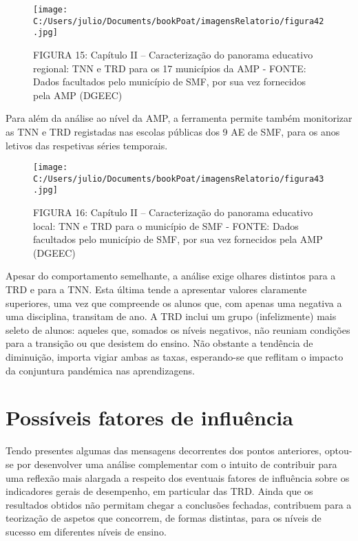 \documentclass[
]{book}
\begin{document}
\begin{figure}
\centering
\texttt{[image: C:/Users/julio/Documents/bookPoat/imagensRelatorio/figura42.jpg]}
\caption{FIGURA 15: Capítulo II -- Caracterização do panorama educativo regional: TNN e TRD para os 17 municípios da AMP - FONTE: Dados facultados pelo município de SMF, por sua vez fornecidos pela AMP (DGEEC)}
\end{figure}

Para além da análise ao nível da AMP, a ferramenta permite também monitorizar as TNN e TRD registadas nas escolas públicas dos 9 AE de SMF, para os anos letivos das respetivas séries temporais.

\begin{figure}
\centering
\texttt{[image: C:/Users/julio/Documents/bookPoat/imagensRelatorio/figura43.jpg]}
\caption{FIGURA 16: Capítulo II -- Caracterização do panorama educativo local: TNN e TRD para o município de SMF - FONTE: Dados facultados pelo município de SMF, por sua vez fornecidos pela AMP (DGEEC)}
\end{figure}

Apesar do comportamento semelhante, a análise exige olhares distintos para a TRD e para a TNN. Esta última tende a apresentar valores claramente superiores, uma vez que compreende os alunos que, com apenas uma negativa a uma disciplina, transitam de ano. A TRD inclui um grupo (infelizmente) mais seleto de alunos: aqueles que, somados os níveis negativos, não reuniam condições para a transição ou que desistem do ensino. Não obstante a tendência de diminuição, importa vigiar ambas as taxas, esperando-se que reflitam o impacto da conjuntura pandémica nas aprendizagens.

\hypertarget{possuxedveis-fatores-de-influuxeancia}{%
\section{\texorpdfstring{\textbf{Possíveis fatores de influência}}{Possíveis fatores de influência}}\label{possuxedveis-fatores-de-influuxeancia}}

Tendo presentes algumas das mensagens decorrentes dos pontos anteriores, optou-se por desenvolver uma análise complementar com o intuito de contribuir para uma reflexão mais alargada a respeito dos eventuais fatores de influência sobre os indicadores gerais de desempenho, em particular das TRD. Ainda que os resultados obtidos não permitam chegar a conclusões fechadas, contribuem para a teorização de aspetos que concorrem, de formas distintas, para os níveis de sucesso em diferentes níveis de ensino.
\end{document}
